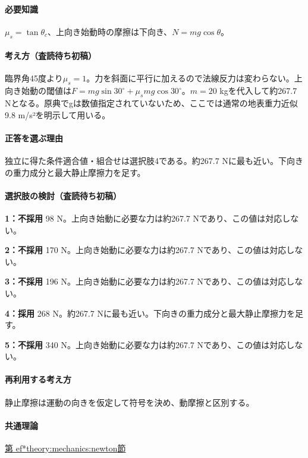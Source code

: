 \paragraph{必要知識} \(\mu_s=\tan\theta_c\)、上向き始動時の摩擦は下向き、\(N=mg\cos\theta\)。

\paragraph{考え方（査読待ち初稿）} 臨界角45度より\(\mu_s=1\)。力を斜面に平行に加えるので法線反力は変わらない。上向き始動の閾値は\(F=mg\sin30^\circ+\mu_smg\cos30^\circ\)。\(m=20\) kgを代入して約267.7 Nとなる。原典でgは数値指定されていないため、ここでは通常の地表重力近似9.8 m/s²を明示して用いる。

\paragraph{正答を選ぶ理由} 独立に得た条件適合値・組合せは選択肢4である。約267.7 Nに最も近い。下向きの重力成分と最大静止摩擦力を足す。

\paragraph{選択肢の検討（査読待ち初稿）}

\noindent\textbf{1：不採用} 98 N。上向き始動に必要な力は約267.7 Nであり、この値は対応しない。\par

\noindent\textbf{2：不採用} 170 N。上向き始動に必要な力は約267.7 Nであり、この値は対応しない。\par

\noindent\textbf{3：不採用} 196 N。上向き始動に必要な力は約267.7 Nであり、この値は対応しない。\par

\noindent\textbf{4：採用} 268 N。約267.7 Nに最も近い。下向きの重力成分と最大静止摩擦力を足す。\par

\noindent\textbf{5：不採用} 340 N。上向き始動に必要な力は約267.7 Nであり、この値は対応しない。\par

\paragraph{再利用する考え方} 静止摩擦は運動の向きを仮定して符号を決め、動摩擦と区別する。

\paragraph{共通理論} \hyperref[theory:mechanics:newton]{第
ef*{theory:mechanics:newton}節}

